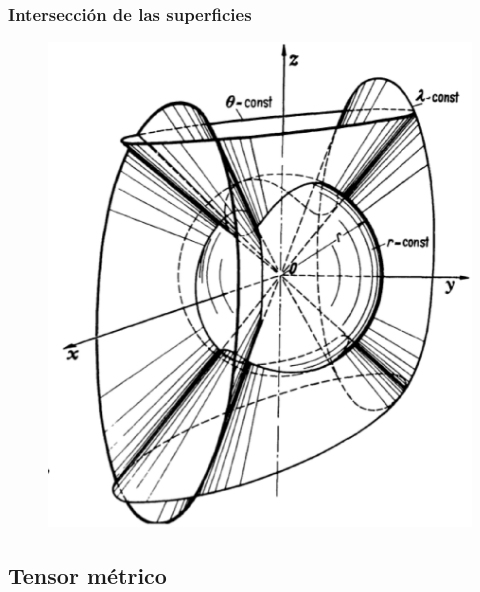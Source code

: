 \documentclass[12pt]{beamer}
\begin{document}
\begin{frame}
\frametitle{Intersección de las superficies}
\begin{figure}
  \centering
  \includegraphics[scale=0.3]{Imagenes/Sistema_Conico.eps}
\end{figure}
\end{frame}

\subsection{Tensor métrico}
\end{document}
